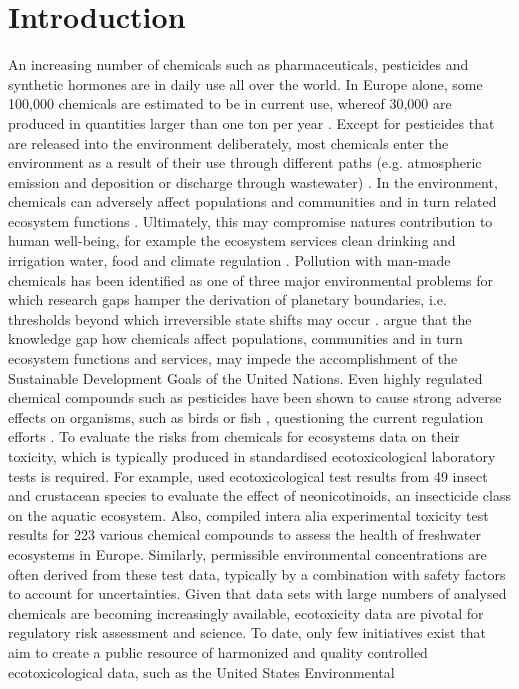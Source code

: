 \section*{Introduction}
An increasing number of chemicals such as pharmaceuticals, pesticides and synthetic hormones are in daily use all over the world. In Europe alone, some 100,000 chemicals are estimated to be in current use, whereof 30,000 are produced in quantities larger than one ton per year \citep{breithaupt_costs_2006}. Except for pesticides that are released into the environment deliberately, most chemicals enter the environment as a result of their use through different paths (e.g. atmospheric emission and deposition or discharge through wastewater) \citep{schwarzenbach_challenge_2006}. In the environment, chemicals can adversely affect populations and communities and in turn related ecosystem functions \citep{rhind_anthropogenic_2009, clements_community_2009, hallmann_declines_2014, barracaracciolo_pharmaceuticals_2015, johnston_review_2015, hallmann_more_2017, sanchez-bayo_worldwide_2019}. Ultimately, this may compromise natures contribution to human well-being, for example the ecosystem services clean drinking and irrigation water, food and climate regulation \citep{peters_review_2013, vandersluijs_neonicotinoids_2013, barracaracciolo_pharmaceuticals_2015, yamamuro_neonicotinoids_2019}. Pollution with man-made chemicals has been identified as one of three major environmental problems for which research gaps hamper the derivation of planetary boundaries, i.e. thresholds beyond which irreversible state shifts may occur \citep{steffen_anthropocene_2007, steffen_planetary_2015}. \citet{bernhardt_synthetic_2017} argue that the knowledge gap how chemicals affect populations, communities and in turn ecosystem functions and services, may impede the accomplishment of the Sustainable Development Goals of the United Nations. Even highly regulated chemical compounds such as pesticides have been shown to cause strong adverse effects on organisms, such as birds \citep{hallmann_declines_2014} or fish \citep{yamamuro_neonicotinoids_2019}, questioning the current regulation efforts \citep{schafer_future_2019}. To evaluate the risks from chemicals for ecosystems data on their toxicity, which is typically produced in standardised ecotoxicological laboratory tests is required. For example, \citet{morrissey_neonicotinoid_2015} used ecotoxicological test results from 49 insect and crustacean species to evaluate the effect of neonicotinoids, an insecticide class on the aquatic ecosystem. Also, \citet{malaj_organic_2014} compiled intera alia experimental toxicity test results for 223 various chemical compounds to assess the health of freshwater ecosystems in Europe. Similarly, permissible environmental concentrations are often derived from these test data, typically by a combination with safety factors to account for uncertainties. Given that data sets with large numbers of analysed chemicals are becoming increasingly available, ecotoxicity data are pivotal for regulatory risk assessment and science. To date, only few initiatives exist that aim to create a public resource of harmonized and quality controlled ecotoxicological data, such as the United States Environmental 